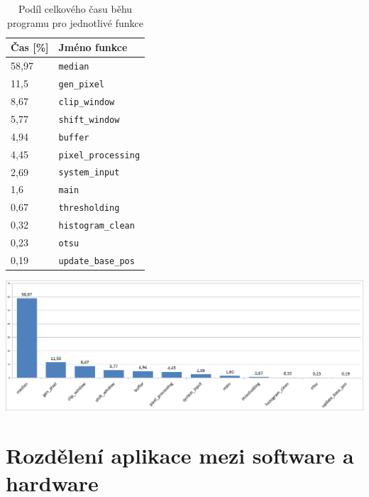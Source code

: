 \documentclass[12pt,a4paper,titlepage,final]{report}
\begin{document}
\begin{table}[h!]
	\begin{center}
    \begin{tabular}{ | p{3cm} | p{6cm} |}
    \hline
    Čas [\%] & Jméno funkce
    \\ \hline
    
    58,97 & \verb|median|
    \\ \hline
	11,5 & \verb|gen_pixel|
	\\ \hline
	8,67 & \verb|clip_window|
	\\ \hline
	5,77 & \verb|shift_window|
	\\ \hline
	4,94 & \verb|buffer|
	\\ \hline
	4,45 & \verb|pixel_processing|
	\\ \hline
	2,69 & \verb|system_input|
	\\ \hline
	1,6 & \verb|main|
	\\ \hline
	0,67 & \verb|thresholding|
	\\ \hline
	0,32 & \verb|histogram_clean|
	\\ \hline
	0,23 & \verb|otsu|
	\\ \hline
	0,19 & \verb|update_base_pos|
	\\ \hline
    	
	
    \end{tabular}
	\end{center}	
	\caption{Podíl celkového času běhu programu pro jednotlivé funkce}  
\end{table}

\begin{center}
	\captionsetup{type=figure}
		\includegraphics[width=16cm]{images/graf.png}
\end{center}

\newpage
\section{Rozdělení aplikace mezi software a hardware}
\end{document}
